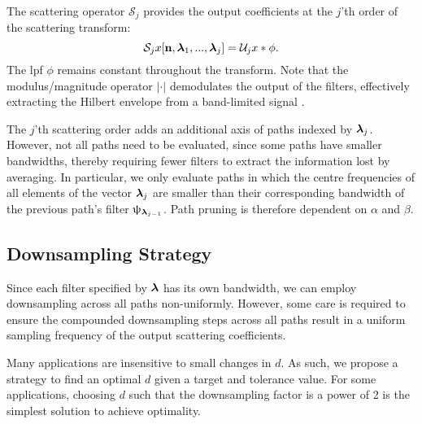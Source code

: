 The scattering operator $\mathcal{S}_j$ provides the output coefficients at the $j$'th order of the scattering transform:
\begin{equation}
    \mathcal{S}_j x[\boldsymbol{\mathbf{n}}, \boldsymbol{\mathbf{\lambda}}_1, ..., \boldsymbol{\mathbf{\lambda}}_j] = \mathcal{U}_j x * \phi.
\end{equation}
The \ac{lpf} $\phi$ remains constant throughout the transform. Note that the modulus/magnitude operator $|\cdot|$ demodulates the output of the filters, effectively extracting the Hilbert envelope from a band-limited signal \cite{waveletsandsubbandcoding}. 

The $j$'th scattering order adds an additional axis of paths indexed by $\boldsymbol{\mathbf{\lambda}}_j$. However, not all paths need to be evaluated, since some paths have smaller bandwidths, thereby requiring fewer filters to extract the information lost by averaging. In particular, we only evaluate paths in which the centre frequencies of all elements of the vector $\boldsymbol{\mathbf{\lambda}}_{j}$ are smaller than their corresponding bandwidth of the previous path's filter $\uppsi_{\boldsymbol{\mathbf{\lambda}}_{j-1}}$. Path pruning is therefore dependent on $\alpha$ and $\beta$.

\subsection{Downsampling Strategy}
Since each filter specified by $\boldsymbol{\mathbf{\lambda}}$ has its own bandwidth, we can employ downsampling across all paths non-uniformly. However, some care is required to ensure the compounded downsampling steps across all paths result in a uniform sampling frequency of the output scattering coefficients.



Many applications are insensitive to small changes in $d$. As such, we propose a strategy to find an optimal $d$ given a target and tolerance value. For some applications, choosing $d$ such that the downsampling factor is a power of 2 is the simplest solution to achieve optimality. 

